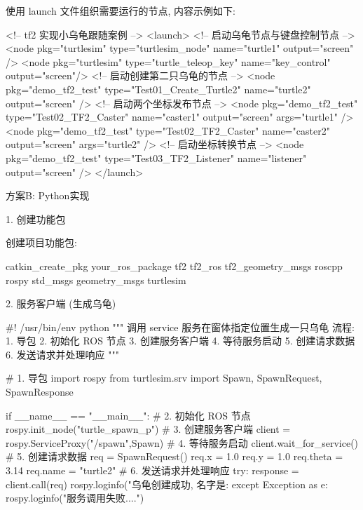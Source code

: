 \documentclass[openany, fontset=windowsold]{ctexbook}
\theoremstyle{kaiti}
\theoremstyle{normal}
\begin{document}
使用 launch 文件组织需要运行的节点, 内容示例如下:

\begin{xml}
  <!-- tf2 实现小乌龟跟随案例 -->
  <launch>
      <!-- 启动乌龟节点与键盘控制节点 -->
      <node pkg="turtlesim" type="turtlesim_node" name="turtle1" output="screen" />
      <node pkg="turtlesim" type="turtle_teleop_key" name="key_control" output="screen"/>
      <!-- 启动创建第二只乌龟的节点 -->
      <node pkg="demo_tf2_test" type="Test01_Create_Turtle2" name="turtle2" output="screen" />
      <!-- 启动两个坐标发布节点 -->
      <node pkg="demo_tf2_test" type="Test02_TF2_Caster" name="caster1" output="screen" args="turtle1" />
      <node pkg="demo_tf2_test" type="Test02_TF2_Caster" name="caster2" output="screen" args="turtle2" />
      <!-- 启动坐标转换节点 -->
      <node pkg="demo_tf2_test" type="Test03_TF2_Listener" name="listener" output="screen" />
  </launch>
\end{xml}

方案B: Python实现

1. 创建功能包

创建项目功能包:

\begin{bash}
  catkin_create_pkg your_ros_package tf2 tf2_ros tf2_geometry_msgs roscpp rospy std_msgs geometry_msgs turtlesim
\end{bash}

2. 服务客户端 (生成乌龟)

\begin{python}
  #! /usr/bin/env python
  """  
      调用 service 服务在窗体指定位置生成一只乌龟
      流程:
          1. 导包
          2. 初始化 ROS 节点
          3. 创建服务客户端
          4. 等待服务启动
          5. 创建请求数据
          6. 发送请求并处理响应
  """

  # 1. 导包
  import rospy
  from turtlesim.srv import Spawn, SpawnRequest, SpawnResponse

  if __name__ == "__main__":
      # 2. 初始化 ROS 节点
      rospy.init_node("turtle_spawn_p")
      # 3. 创建服务客户端
      client = rospy.ServiceProxy("/spawn",Spawn)
      # 4. 等待服务启动
      client.wait_for_service()
      # 5. 创建请求数据
      req = SpawnRequest()
      req.x = 1.0
      req.y = 1.0
      req.theta = 3.14
      req.name = "turtle2"
      # 6. 发送请求并处理响应
      try:
          response = client.call(req)
          rospy.loginfo("乌龟创建成功, 名字是:%
      except Exception as e:
          rospy.loginfo("服务调用失败....")
\end{python}
\end{document}
